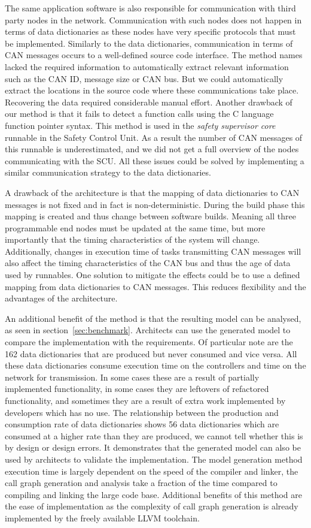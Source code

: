 The same application software is also responsible for communication with third party nodes in the network. Communication with such nodes does not happen in terms of data dictionaries as these nodes have very specific protocols that must be implemented. Similarly to the data dictionaries, communication in terms of CAN messages occurs to a well-defined source code interface. The method names lacked the required information to automatically extract relevant information such as the CAN ID, message size or CAN bus. But we could automatically extract the locations in the source code where these communications take place. Recovering the data required considerable manual effort. Another drawback of our method is that it fails to detect a function calls using the C language function pointer syntax. This method is used in the \textit{safety supervisor core} runnable in the Safety Control Unit. As a result the number of CAN messages of this runnable is underestimated, and we did not get a full overview of the nodes communicating with the SCU. All these issues could be solved by implementing a similar communication strategy to the data dictionaries.

A drawback of the architecture is that the mapping of data dictionaries to CAN messages is not fixed and in fact is non-deterministic. During the build phase this mapping is created and thus change between software builds. Meaning all three programmable end nodes must be updated at the same time, but more importantly that the timing characteristics of the system will change. Additionally, changes in execution time of tasks transmitting CAN messages will also affect the timing characteristics of the CAN bus and thus the age of data used by runnables. One solution to mitigate the effects could be to use a defined mapping from data dictionaries to CAN messages. This reduces flexibility and the advantages of the architecture.

An additional benefit of the method is that the resulting model can be analysed, as seen in section~\ref{sec:benchmark}. Architects can use the generated model to compare the implementation with the requirements. Of particular note are the 162 data dictionaries that are produced but never consumed and vice versa. All these data dictionaries consume execution time on the controllers and time on the network for transmission. In some cases these are a result of partially implemented functionality, in some cases they are leftovers of refactored functionality, and sometimes they are a result of extra work implemented by developers which has no use. The relationship between the production and consumption rate of data dictionaries shows 56 data dictionaries which are consumed at a higher rate than they are produced, we cannot tell whether this is by design or design errors. It demonstrates that the generated model can also be used by architects to validate the implementation. The model generation method execution time is largely dependent on the speed of the compiler and linker, the call graph generation and analysis take a fraction of the time compared to compiling and linking the large code base. Additional benefits of this method are the ease of implementation as the complexity of call graph generation is already implemented by the freely available LLVM toolchain.

